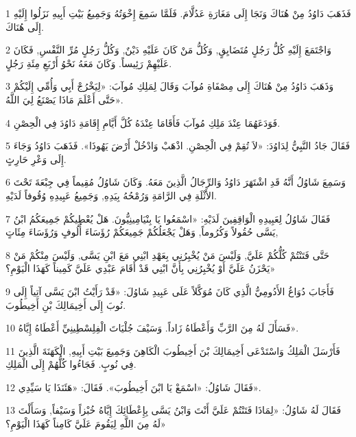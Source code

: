 \par 1 فَذَهَبَ دَاوُدُ مِنْ هُنَاكَ وَنَجَا إِلَى مَغَارَةِ عَدُلَّامَ. فَلَمَّا سَمِعَ إِخْوَتُهُ وَجَمِيعُ بَيْتِ أَبِيهِ نَزَلُوا إِلَيْهِ إِلَى هُنَاكَ.
\par 2 وَاجْتَمَعَ إِلَيْهِ كُلُّ رَجُلٍ مُتَضَايِقٍ, وَكُلُّ مَنْ كَانَ عَلَيْهِ دَيْنٌ, وَكُلُّ رَجُلٍ مُرِّ النَّفْسِ, فَكَانَ عَلَيْهِمْ رَئِيساً. وَكَانَ مَعَهُ نَحْوُ أَرْبَعِ مِئَةِ رَجُلٍ.
\par 3 وَذَهَبَ دَاوُدُ مِنْ هُنَاكَ إِلَى مِصْفَاةِ مُوآبَ وَقَالَ لِمَلِكِ مُوآبَ: «لِيَخْرُجْ أَبِي وَأُمِّي إِلَيْكُمْ حَتَّى أَعْلَمَ مَاذَا يَصْنَعُ لِيَ اللَّهُ».
\par 4 فَوَدَعَهُمَا عِنْدَ مَلِكِ مُوآبَ فَأَقَامَا عِنْدَهُ كُلَّ أَيَّامِ إِقَامَةِ دَاوُدَ فِي الْحِصْنِ.
\par 5 فَقَالَ جَادُ النَّبِيُّ لِدَاوُدَ: «لاَ تُقِمْ فِي الْحِصْنِ. اذْهَبْ وَادْخُلْ أَرْضَ يَهُوذَا». فَذَهَبَ دَاوُدُ وَجَاءَ إِلَى وَعْرِ حَارِثٍ.
\par 6 وَسَمِعَ شَاوُلُ أَنَّهُ قَدِ اشْتَهَرَ دَاوُدُ وَالرِّجَالُ الَّذِينَ مَعَهُ. وَكَانَ شَاوُلُ مُقِيماً فِي جِبْعَةَ تَحْتَ الأَثْلَةِ فِي الرَّامَةِ وَرُمْحُهُ بِيَدِهِ, وَجَمِيعُ عَبِيدِهِ وُقُوفاً لَدَيْهِ.
\par 7 فَقَالَ شَاوُلُ لِعَبِيدِهِ الْوَاقِفِينَ لَدَيْهِ: «اسْمَعُوا يَا بِنْيَامِينِيُّونَ. هَلْ يُعْطِيكُمْ جَمِيعَكُمُ ابْنُ يَسَّى حُقُولاً وَكُرُوماً, وَهَلْ يَجْعَلُكُمْ جَمِيعَكُمْ رُؤَسَاءَ أُلُوفٍ وَرُؤَسَاءَ مِئَاتٍ,
\par 8 حَتَّى فَتَنْتُمْ كُلُّكُمْ عَلَيَّ, وَلَيْسَ مَنْ يُخْبِرُنِي بِعَهْدِ ابْنِي مَعَ ابْنِ يَسَّى, وَلَيْسَ مِنْكُمْ مَنْ يَحْزَنُ عَلَيَّ أَوْ يُخْبِرُنِي بِأَنَّ ابْنِي قَدْ أَقَامَ عَبْدِي عَلَيَّ كَمِيناً كَهَذَا الْيَوْمِ؟»
\par 9 فَأَجَابَ دُوَاغُ الأَدُومِيُّ الَّذِي كَانَ مُوَكَّلاً عَلَى عَبِيدِ شَاوُلَ: «قَدْ رَأَيْتُ ابْنَ يَسَّى آتِياً إِلَى نُوبَ إِلَى أَخِيمَالِكَ بْنِ أَخِيطُوبَ.
\par 10 فَسَأَلَ لَهُ مِنَ الرَّبِّ وَأَعْطَاهُ زَاداً. وَسَيْفَ جُلْيَاتَ الْفِلِسْطِينِيِّ أَعْطَاهُ إِيَّاهُ».
\par 11 فَأَرْسَلَ الْمَلِكُ وَاسْتَدْعَى أَخِيمَالِكَ بْنَ أَخِيطُوبَ الْكَاهِنَ وَجَمِيعَ بَيْتِ أَبِيهِ, الْكَهَنَةَ الَّذِينَ فِي نُوبٍ. فَجَاءُوا كُلُّهُمْ إِلَى الْمَلِكِ.
\par 12 فَقَالَ شَاوُلُ: «اسْمَعْ يَا ابْنَ أَخِيطُوبَ». فَقَالَ: «هَئَنَذَا يَا سَيِّدِي».
\par 13 فَقَالَ لَهُ شَاوُلُ: «لِمَاذَا فَتَنْتُمْ عَلَيَّ أَنْتَ وَابْنُ يَسَّى بِإِعْطَائِكَ إِيَّاهُ خُبْزاً وَسَيْفاً, وَسَأَلْتَ لَهُ مِنَ اللَّهِ لِيَقُومَ عَلَيَّ كَامِناً كَهَذَا الْيَوْمِ؟»

